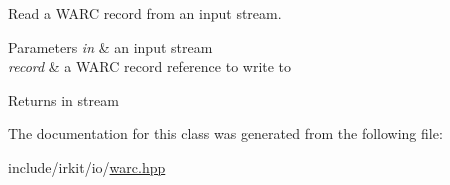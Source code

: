 Read a W\+A\+RC record from an input stream. 


\begin{DoxyParams}{Parameters}
{\em in} & an input stream \\
\hline
{\em record} & a W\+A\+RC record reference to write to \\
\hline
\end{DoxyParams}
\begin{DoxyReturn}{Returns}
{\ttfamily in} stream 
\end{DoxyReturn}


The documentation for this class was generated from the following file\+:\begin{DoxyCompactItemize}
\item 
include/irkit/io/\mbox{\hyperlink{warc_8hpp}{warc.\+hpp}}\end{DoxyCompactItemize}
